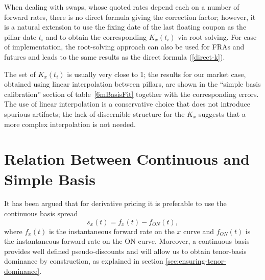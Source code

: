 \documentclass{article}
\begin{document}
When dealing with swaps, whose quoted rates depend each on a number of forward rates, there is no direct formula giving the correction factor; however, it is a natural extension to use the fixing date of the last floating coupon as the pillar date $t_i$ and to obtain the corresponding $K_x(t_i)$ via root solving. For ease of implementation, the root-solving approach can also be used for FRAs and futures and leads to the same results as the direct formula (\ref{direct-k}).

The set of $K_x(t_i)$ is usually very close to 1; the results for our market case, obtained using linear interpolation between pillars, are shown in the ``simple basis calibration'' section of table~\ref{6mBasisFit} together with the corresponding errors.  The use of linear interpolation is a conservative choice that does not introduce spurious artifacts; the lack of discernible structure for the $K_x$ suggests that a more complex interpolation is not needed.













\section{Relation Between Continuous and Simple Basis}


It has been argued \cite{schlenkrich-miemiec} that  for derivative pricing it is preferable to use the continuous basis spread
\begin{equation}
\label{eq:s_x}
s_x(t) = f_x(t) - f_{ON}(t),
\end{equation}
where $f_x(t)$ is the instantaneous forward rate on the $x$ curve and $f_{ON}(t)$ is the instantaneous forward rate on the ON curve. Moreover, a continuous basis provides well defined pseudo-discounts and will allow us to obtain tenor-basis dominance by construction, as explained in section \ref{sec:ensuring-tenor-dominance}.
\end{document}
